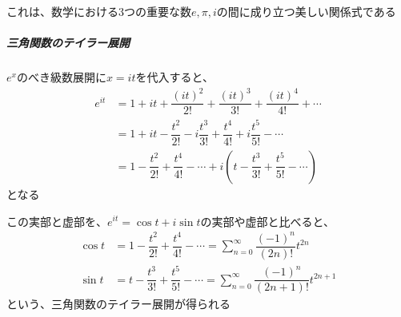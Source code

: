 \documentclass[../book_jiriki_calc]{subfiles}
\begin{document}
これは、数学における3つの重要な数$e, \pi, i$の間に成り立つ美しい関係式である

\br

\subparagraph{三角関数のテイラー展開}\quad

$e^x$のべき級数展開に$x = it$を代入すると、
\begin{align}
  e^{it} & = 1 + it + \dfrac{(it)^2}{2!} + \dfrac{(it)^3}{3!} + \dfrac{(it)^4}{4!} + \cdots                                \\
         & = 1 + it - \dfrac{t^2}{2!} - i\dfrac{t^3}{3!} + \dfrac{t^4}{4!} + i\dfrac{t^5}{5!} - \cdots                     \\
         & = 1 - \dfrac{t^2}{2!} + \dfrac{t^4}{4!} - \cdots + i\left(t - \dfrac{t^3}{3!} + \dfrac{t^5}{5!} - \cdots\right)
\end{align}
となる

この実部と虚部を、$e^{it} = \cos t + i\sin t$の実部や虚部と比べると、
\begin{align}
  \cos t & = 1 - \dfrac{t^2}{2!} + \dfrac{t^4}{4!} - \cdots = \sum_{n=0}^{\infty}\dfrac{(-1)^n}{(2n)!}t^{2n}     \\
  \sin t & = t - \dfrac{t^3}{3!} + \dfrac{t^5}{5!} - \cdots = \sum_{n=0}^{\infty}\dfrac{(-1)^n}{(2n+1)!}t^{2n+1}
\end{align}
という、三角関数のテイラー展開が得られる
\end{document}
